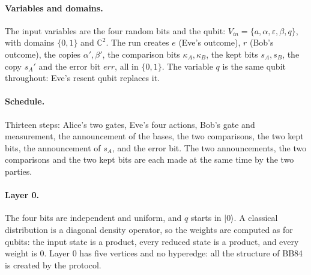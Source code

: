 \documentclass[11pt]{article}
\begin{document}
\paragraph{Variables and domains.} The input variables are the four random bits and the qubit: $V_{in}=\{a,\alpha,\varepsilon,\beta,q\}$, with domains $\{0,1\}$ and $\mathbb{C}^2$. The run creates $e$ (Eve's outcome), $r$ (Bob's outcome), the copies $\alpha',\beta'$, the comparison bits $\kappa_A,\kappa_B$, the kept bits $s_A,s_B$, the copy $s_A'$ and the error bit $\mathit{err}$, all in $\{0,1\}$. The variable $q$ is the same qubit throughout: Eve's resent qubit replaces it.

\paragraph{Schedule.} Thirteen steps: Alice's two gates, Eve's four actions, Bob's gate and measurement, the announcement of the bases, the two comparisons, the two kept bits, the announcement of $s_A$, and the error bit. The two announcements, the two comparisons and the two kept bits are each made at the same time by the two parties.

\paragraph{Layer 0.} The four bits are independent and uniform, and $q$ starts in $|0\rangle$. A classical distribution is a diagonal density operator, so the weights are computed as for qubits: the input state is a product, every reduced state is a product, and every weight is $0$. Layer $0$ has five vertices and no hyperedge: all the structure of BB84 is created by the protocol.
\end{document}
